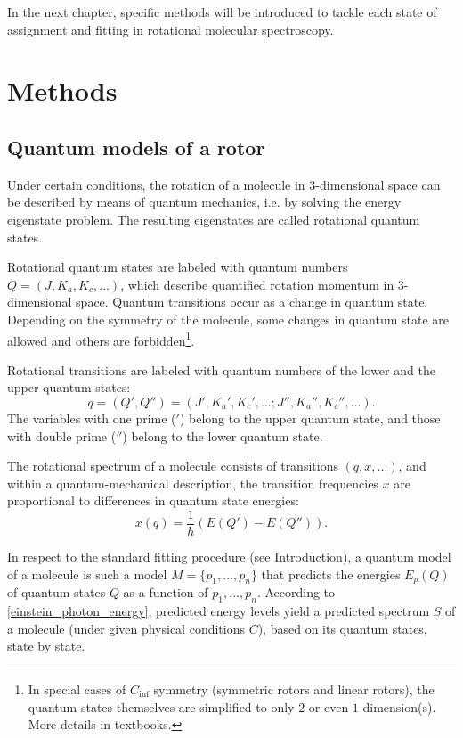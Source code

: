 \documentclass[11pt]{article}
\begin{document}
In the next chapter, specific methods will be introduced to tackle each state of assignment and fitting in rotational molecular spectroscopy.

\section{Methods}

\subsection{Quantum models of a rotor}

Under certain conditions, the rotation of a molecule in $3$-dimensional space can be described by means of quantum mechanics, i.e. by solving the energy eigenstate problem. The resulting eigenstates are called rotational quantum states. 

Rotational quantum states are labeled with quantum numbers $Q = (J, {K_a}, {K_c}, ...)$, which describe quantified rotation momentum in $3$-dimensional space. Quantum transitions occur as a change in quantum state. Depending on the symmetry of the molecule, some changes in quantum state are allowed and others are forbidden\footnote{In special cases of $C_{\inf}$ symmetry (symmetric rotors and linear rotors), the quantum states themselves are simplified to only $2$ or even $1$ dimension(s). More details in textbooks.}. 

Rotational transitions are labeled with quantum numbers of the lower and the upper quantum states:
\begin{equation} 
\label{quantum_numbers}
q = (Q', Q'') = (J', {K_a}', {K_c}', ...; J'', {K_a}'', {K_c}'', ...).
\end{equation}
The variables with one prime ($'$) belong to the upper quantum state, and those with double prime ($''$) belong to the lower quantum state. 

The rotational spectrum of a molecule consists of transitions $(q, x, ...)$, and within a quantum-mechanical description, the transition frequencies $x$ are proportional to differences in quantum state energies:
\begin{equation} 
\label{einstein_photon_energy}
 x(q) = \frac{1}{h}(E(Q') - E(Q'')).
\end{equation} 

In respect to the standard fitting procedure (see Introduction), a quantum model of a molecule is such a model $M = \{p_1, ..., p_n\}$ that predicts the energies $E_p(Q)$ of quantum states $Q$ as a function of $p_1, ..., p_n$. According to \ref{einstein_photon_energy}, predicted energy levels yield a predicted spectrum $S$ of a molecule (under given physical conditions $C$), based on its quantum states, state by state. 
\end{document}
